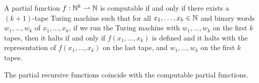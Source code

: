 \begin{proposition}
  A partial function $f: \mathbb{N}^k \rightharpoonup \mathbb{N}$ is computable if and only if
  there exists a $(k+1)$-tape Turing machine such that for all $x_1, \ldots, x_k
  \in \mathbb{N}$ and binary words $w_1, \ldots, w_k$ of $x_1, \ldots, x_k$, if we run
  the Turing machine with $w_1, \ldots, w_k$ on the first $k$ tapes, then it
  halts if and only if $f(x_1, \ldots, x_k)$ is defined and it halts with the
  representation of $f(x_1, \ldots, x_k)$ on the last tape, and $w_1, \ldots,
  w_k$ on the first $k$ tapes.
\end{proposition}

\begin{theorem}
  The partial recursive functions coincide with the computable partial functions.
\end{theorem}

